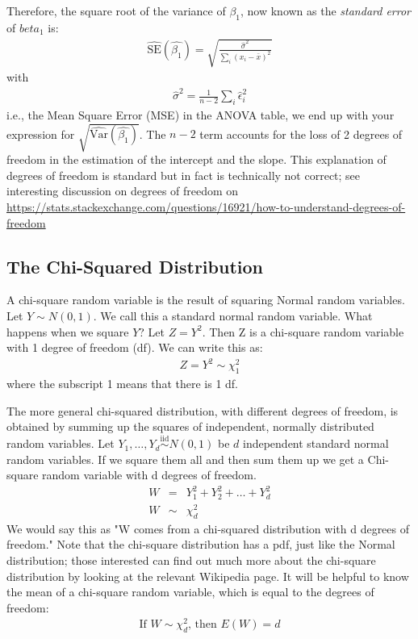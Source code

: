 \documentclass[11pt]{article}
\theoremstyle{remark}
\begin{document}
Therefore, the square root of the variance of $\beta_1$, now known as the \emph{standard error} of $beta_1$ is:
\begin{eqnarray}
\widehat{\text{SE}}(\hat{\beta_1}) = \sqrt{\frac{\hat{\sigma}^2}{\sum_i (x_i - \bar{x})^2}}
\end{eqnarray}
with
\begin{eqnarray}
\hat{\sigma}^2 = \frac{1}{n-2} \sum_i \hat{\epsilon}_i^2
\end{eqnarray}
i.e., the Mean Square Error (MSE) in the ANOVA table, we end up with your expression for $\sqrt{\widehat{\text{Var}}(\hat{\beta_1})}$. The $n-2$ term accounts for the loss of 2 degrees of freedom in the estimation of the intercept and the slope. This explanation of degrees of freedom is standard but in fact is technically not correct; see interesting discussion on degrees of freedom on \url{https://stats.stackexchange.com/questions/16921/how-to-understand-degrees-of-freedom}


\pagebreak
\subsection{The Chi-Squared Distribution}\label{SectionChiSquare}
A chi-square random variable is the result of squaring Normal random variables.  Let $Y\sim N(0,1)$. We call this a standard normal random variable. What happens when we square $Y$?  Let $Z=Y^2$.  Then Z is a chi-square random variable with 1 degree of freedom (df).  We can write this as:
\begin{eqnarray}
Z=Y^2 \sim \chi_1^2
\end{eqnarray}
where the subscript 1 means that there is 1 df.

The more general chi-squared distribution, with different degrees of freedom, is obtained by summing up the squares of independent, normally distributed random variables.
Let $Y_1,\hdots,Y_d\overset{\mathrm{iid}}{\sim}N(0,1)$ be $d$ independent standard normal random variables. If we square them all and then sum them up we get a Chi-square random variable with d degrees of freedom.
\begin{eqnarray}
W&=&Y_1^2+Y_2^2+\hdots+Y_d^2\nonumber\\
W&\sim&\chi_d^2
\end{eqnarray}
We would say this as "W comes from a chi-squared distribution with d degrees of freedom."  Note that the chi-square distribution has a pdf, just like the Normal distribution; those interested can find out much more about the chi-square distribution by looking at the relevant Wikipedia page.  It will be helpful to know the mean of a chi-square random variable, which is equal to the degrees of freedom:
\begin{eqnarray}
\text{If $W\sim\chi_d^2$, then $E(W)=d$}
\end{eqnarray}
\end{document}
